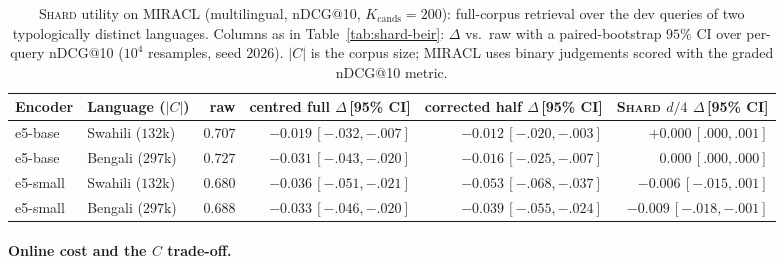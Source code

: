\begin{table}[tbp]
\begin{singlespace}
\centering
\caption{\textsc{Shard} utility on MIRACL (multilingual, nDCG@10,
$K_{\mathrm{cands}}{=}200$): full-corpus retrieval over the dev queries of two
typologically distinct languages. Columns as in Table~\ref{tab:shard-beir}:
$\Delta$ vs.\ raw with a paired-bootstrap $95\%$ CI over per-query nDCG@10
($10^4$ resamples, seed $2026$). $|C|$ is the corpus size; MIRACL uses binary
judgements scored with the graded nDCG@10 metric.}
\label{tab:shard-miracl}
\scriptsize
\setlength{\tabcolsep}{4pt}
\begin{adjustbox}{max width=\linewidth}
\begin{tabular}{@{}llrrrr@{}}
\toprule
Encoder & Language ($|C|$) & raw & centred full $\Delta$\,[95\% CI] & corrected half $\Delta$\,[95\% CI] & \textsc{Shard} $d/4$ $\Delta$\,[95\% CI]\\
\midrule
e5-base  & Swahili ($132$k) & $0.707$ & $-0.019\,[{-}.032,{-}.007]$ & $-0.012\,[{-}.020,{-}.003]$ & $\mathbf{+0.000\,[.000,.001]}$\\
e5-base  & Bengali ($297$k) & $0.727$ & $-0.031\,[{-}.043,{-}.020]$ & $-0.016\,[{-}.025,{-}.007]$ & $\mathbf{0.000\,[.000,.000]}$\\
e5-small & Swahili ($132$k) & $0.680$ & $-0.036\,[{-}.051,{-}.021]$ & $-0.053\,[{-}.068,{-}.037]$ & $\mathbf{-0.006\,[{-}.015,.001]}$\\
e5-small & Bengali ($297$k) & $0.688$ & $-0.033\,[{-}.046,{-}.020]$ & $-0.039\,[{-}.055,{-}.024]$ & $\mathbf{-0.009\,[{-}.018,{-}.001]}$\\
\bottomrule
\end{tabular}
\end{adjustbox}
\end{singlespace}
\end{table}

\paragraph{Online cost and the $C$ trade-off.}\label{ssec:shard-cost}

